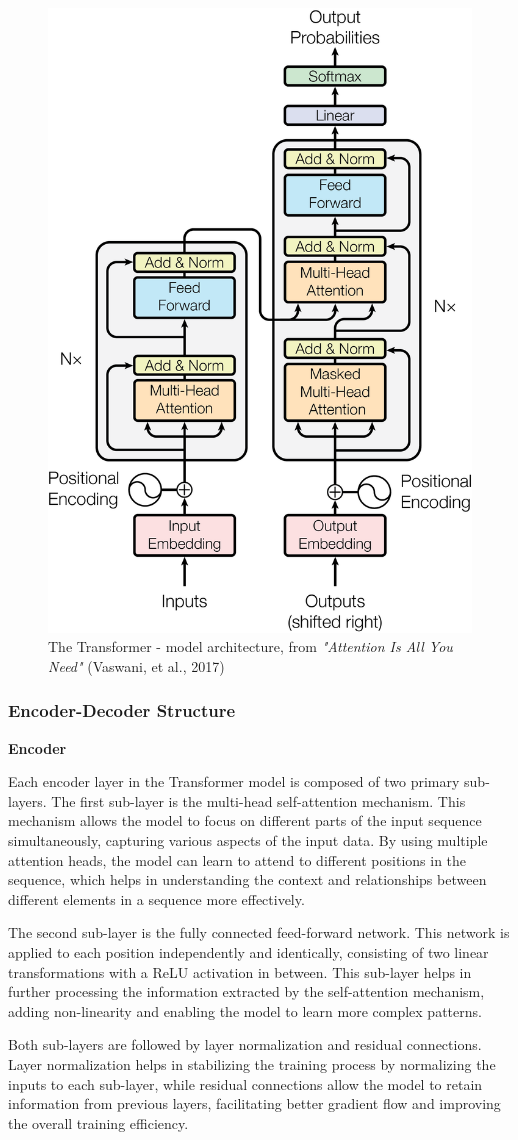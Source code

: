 \begin{figure}[htbp]
    \centering
    \includegraphics[width=6 cm]{3_ChapterTranformerVariants/figuras/Transformer_architecture.png}
    \caption{The Transformer - model architecture, from \textit{"Attention Is All You Need"} (Vaswani, et al., 2017) \cite{vaswani2023attention}}
    \end{figure}

\subsubsection{Encoder-Decoder Structure}

\noindent\textbf{Encoder}

\noindent Each encoder layer in the Transformer model is composed of two primary sub-layers. The first sub-layer is the multi-head self-attention mechanism. This mechanism allows the model to focus on different parts of the input sequence simultaneously, capturing various aspects of the input data. By using multiple attention heads, the model can learn to attend to different positions in the sequence, which helps in understanding the context and relationships between different elements in a sequence more effectively.

The second sub-layer is the fully connected feed-forward network. This network is applied to each position independently and identically, consisting of two linear transformations with a ReLU activation in between. This sub-layer helps in further processing the information extracted by the self-attention mechanism, adding non-linearity and enabling the model to learn more complex patterns.

Both sub-layers are followed by layer normalization and residual connections. Layer normalization helps in stabilizing the training process by normalizing the inputs to each sub-layer, while residual connections allow the model to retain information from previous layers, facilitating better gradient flow and improving the overall training efficiency.
\vspace{10pt}

